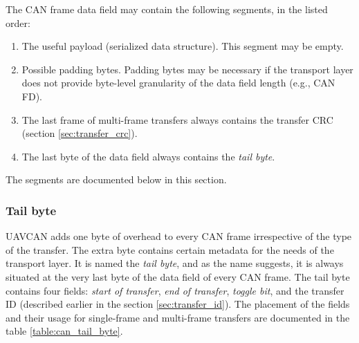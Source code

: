 The CAN frame data field may contain the following segments, in the listed order:
\begin{samepage}
\begin{enumerate}
    \item The useful payload (serialized data structure). This segment may be empty.
    \item Possible padding bytes.
          Padding bytes may be necessary if the transport layer does not provide byte-level
          granularity of the data field length (e.g., CAN FD).
    \item The last frame of multi-frame transfers always contains the transfer CRC (section \ref{sec:transfer_crc}).
    \item The last byte of the data field always contains the \emph{tail byte}.
\end{enumerate}
\end{samepage}
The segments are documented below in this section.

\subsubsection{Tail byte}

UAVCAN adds one byte of overhead to every CAN frame irrespective of the type of the transfer.
The extra byte contains certain metadata for the needs of the transport layer.
It is named the \emph{tail byte}, and as the name suggests, it is always situated
at the very last byte of the data field of every CAN frame.
The tail byte contains four fields: \emph{start of transfer}, \emph{end of transfer},
\emph{toggle bit}, and the transfer ID (described earlier in the section \ref{sec:transfer_id}).
The placement of the fields and their usage for single-frame and multi-frame transfers
are documented in the table \ref{table:can_tail_byte}.

